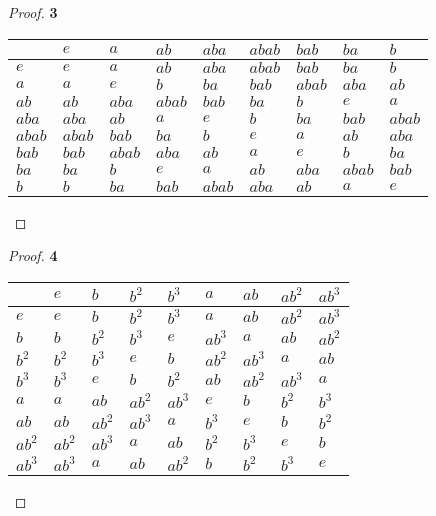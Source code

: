 \documentclass[11pt]{article}
\begin{document}
	\begin{proof}{\textbf{3}}\\ 
		\begin{adjustbox}{max width=\textwidth,center}
		\begin{tabular}{l|llllllll}
			    & $e$ & $a$ & $ab$ & $aba$ & $abab$ & $bab$ & $ba$ & $b$ \\ \hline
			$e$ & $e$ & $a$ & $ab$ & $aba$ & $abab$ & $bab$ & $ba$ & $b$ \\ 
			$a$ & $a$ & $e$ & $b$  & $ba$ & $bab$ & $abab$ & $aba$ & $ab$ \\
		   $ab$ & $ab$ & $aba$ & $abab$ & $bab$ & $ba$ & $b$ & $e$ & $a$ \\			
		  $aba$ & $aba$ & $ab$ & $a$ & $e$ & $b$ & $ba$ & $bab$ & $abab$ \\
		 $abab$ & $abab$ & $bab$ & $ba$ & $b$ & $e$ & $a$ & $ab$ & $aba$ \\
		  $bab$ & $bab$ & $abab$ & $aba$ & $ab$ & $a$ & $e$ & $b$ & $ba$ \\
		   $ba$ & $ba$ & $b$ & $e$ & $a$ & $ab$ & $aba$ & $abab$ & $bab$\\
		    $b$ & $b$ & $ba$ & $bab$ & $abab$ & $aba$ & $ab$ & $a$ & $e$\\
		\end{tabular}
		\end{adjustbox}
	\end{proof}
	\begin{proof}{\textbf{4}}\\ 
		\begin{adjustbox}{max width=\textwidth,center}
		\begin{tabular}{l|llllllll}
			    & $e$ & $b$ & $b^{2}$ & $b^{3}$ & $a$ & $ab$ & $ab^{2}$ & $ab^{3}$ \\ \hline
			$e$ & $e$ & $b$ & $b^{2}$ & $b^{3}$ & $a$ & $ab$ & $ab^{2}$ & $ab^{3}$ \\ 
			$b$ & $b$ & $b^{2}$ & $b^{3}$  & $e$ & $ab^{3}$ & $a$ & $ab$ & $ab^{2}$ \\
		$b^{2}$ & $b^{2}$ & $b^{3}$ & $e$ & $b$ & $ab^{2}$ & $ab^{3}$ & $a$ & $ab$ \\			
		$b^{3}$ & $b^{3}$ & $e$ & $b$ & $b^{2}$ & $ab$ & $ab^{2}$ & $ab^{3}$ & $a$ \\
		    $a$ & $a$ & $ab$ & $ab^{2}$ & $ab^{3}$ & $e$ & $b$ & $b^{2}$ & $b^{3}$ \\
		   $ab$ & $ab$ & $ab^{2}$ & $ab^{3}$ & $a$ & $b^{3}$ & $e$ & $b$ & $b^{2}$ \\
	   $ab^{2}$ & $ab^{2}$ & $ab^{3}$ & $a$ & $ab$ & $b^{2}$ & $b^{3}$ & $e$ & $b$\\
	   $ab^{3}$ & $ab^{3}$ & $a$ & $ab$ & $ab^{2}$ & $b$ & $b^{2}$ & $b^{3}$ & $e$\\
		\end{tabular}
		\end{adjustbox}
	\end{proof}
\end{document}
